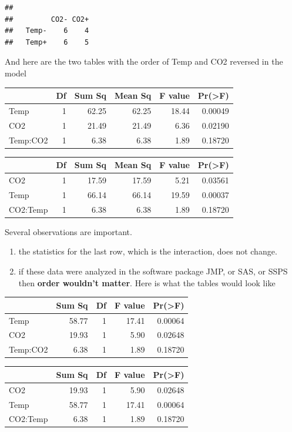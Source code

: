 \documentclass[]{book}
\providecommand{\tightlist}{%
  \setlength{\itemsep}{0pt}\setlength{\parskip}{0pt}}
\begin{document}
\begin{verbatim}
##        
##         CO2- CO2+
##   Temp-    6    4
##   Temp+    6    5
\end{verbatim}

And here are the two tables with the order of Temp and CO2 reversed in
the model

\begin{tabular}{l|r|r|r|r|r}
\hline
  & Df & Sum Sq & Mean Sq & F value & Pr(>F)\\
\hline
Temp & 1 & 62.25 & 62.25 & 18.44 & 0.00049\\
\hline
CO2 & 1 & 21.49 & 21.49 & 6.36 & 0.02190\\
\hline
Temp:CO2 & 1 & 6.38 & 6.38 & 1.89 & 0.18720\\
\hline
\end{tabular}

\begin{tabular}{l|r|r|r|r|r}
\hline
  & Df & Sum Sq & Mean Sq & F value & Pr(>F)\\
\hline
CO2 & 1 & 17.59 & 17.59 & 5.21 & 0.03561\\
\hline
Temp & 1 & 66.14 & 66.14 & 19.59 & 0.00037\\
\hline
CO2:Temp & 1 & 6.38 & 6.38 & 1.89 & 0.18720\\
\hline
\end{tabular}

Several observations are important.

\begin{enumerate}
\def\labelenumi{\arabic{enumi}.}
\tightlist
\item
  the statistics for the last row, which is the interaction, does not
  change.
\item
  if these data were analyzed in the software package JMP, or SAS, or
  SSPS then \textbf{order wouldn't matter}. Here is what the tables
  would look like
\end{enumerate}

\begin{tabular}{l|r|r|r|r}
\hline
  & Sum Sq & Df & F value & Pr(>F)\\
\hline
Temp & 58.77 & 1 & 17.41 & 0.00064\\
\hline
CO2 & 19.93 & 1 & 5.90 & 0.02648\\
\hline
Temp:CO2 & 6.38 & 1 & 1.89 & 0.18720\\
\hline
\end{tabular}

\begin{tabular}{l|r|r|r|r}
\hline
  & Sum Sq & Df & F value & Pr(>F)\\
\hline
CO2 & 19.93 & 1 & 5.90 & 0.02648\\
\hline
Temp & 58.77 & 1 & 17.41 & 0.00064\\
\hline
CO2:Temp & 6.38 & 1 & 1.89 & 0.18720\\
\hline
\end{tabular}
\end{document}
